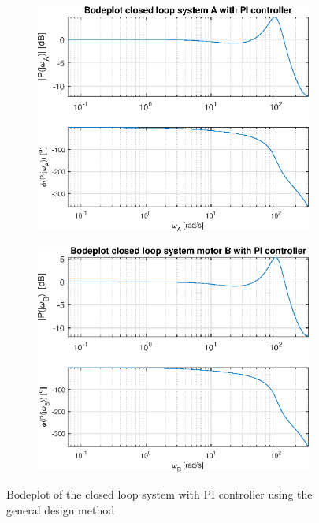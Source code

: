 \documentclass[a4paper,kul]{kulakarticle} %
\begin{document}
\begin{figure}[htp!]
	\centering
	\begin{subfigure}[b]{0.49\textwidth}
		\centering
		\includegraphics[width=\linewidth]{bodeplotA_cl_method1.eps}
		
	\end{subfigure}
	\hfill
	\begin{subfigure}[b]{0.49\textwidth}  
		\centering
		\includegraphics[width=\linewidth]{bodeplotB_cl_method1.eps}
		
	\end{subfigure}
	\caption{Bodeplot of the closed loop system with PI controller using the general design method}
	\label{fig:bodeplotclmethod1}
\end{figure}
\end{document}
